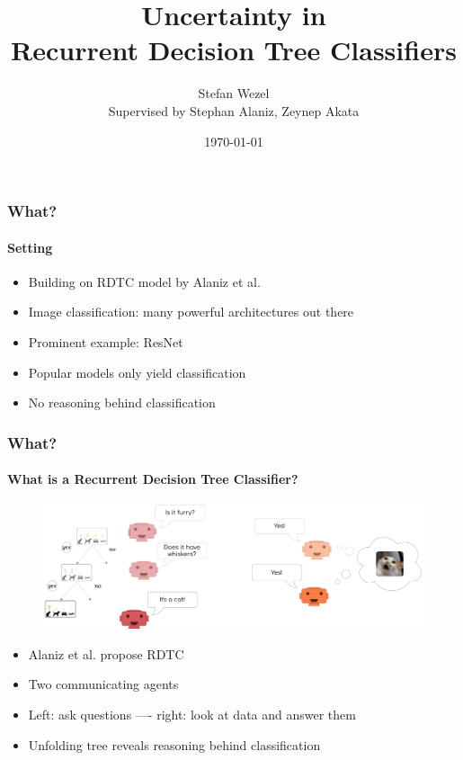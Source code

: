 \documentclass[9pt]{beamer}
\title{Uncertainty in\\Recurrent Decision Tree Classifiers}
\author{Stefan Wezel\\Supervised by Stephan Alaniz, Zeynep Akata}
\institute{Explainable Machine Learning}
\date{\today}
\begin{document}
	

\begin{frame}[plain]
	\titlepage
\end{frame} 

\begin{frame}
\frametitle{What?}
\framesubtitle{Setting}
	\begin{itemize}%
	\item Building on RDTC model by Alaniz et al. \cite{alaniz2019explainable}
	\item Image classification: many powerful architectures out there
	\item Prominent example: ResNet
	\item Popular models only yield classification
	\item No reasoning behind classification
	\end{itemize}
\end{frame} 


\begin{frame}
\frametitle{What?}
\framesubtitle{What is a Recurrent Decision Tree Classifier?}
	\begin{figure}
	\centering
	\includegraphics[width=1\textwidth]{images/rdtc_intuition.pdf}
\end{figure}
\begin{itemize}%
	\item Alaniz et al. \cite{alaniz2019explainable} propose RDTC
	\item Two communicating agents
	\item Left: ask questions ---- right: look at data and answer them
	\item Unfolding tree reveals reasoning behind classification
\end{itemize}
\end{frame} 
\end{document}
